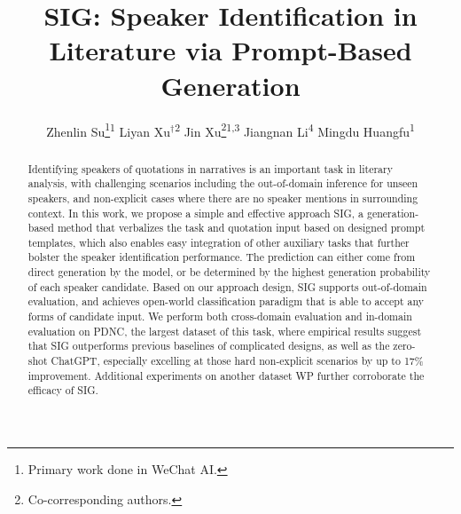 \documentclass[letterpaper]{article} %
\title{SIG: Speaker Identification in Literature via Prompt-Based Generation}
\author {
    Zhenlin Su\thanks{Primary work done in WeChat AI.}\textsuperscript{\rm 1}\;
    Liyan Xu$^\dagger$\textsuperscript{\rm 2}\;
    Jin Xu\thanks{Co-corresponding authors.}\textsuperscript{\rm 1,3}\;
    Jiangnan Li\textsuperscript{\rm 4}\;
    Mingdu Huangfu\textsuperscript{\rm 1}
}
\begin{document}
\maketitle

\begin{abstract}

Identifying speakers of quotations in narratives is an important task in literary analysis, with challenging scenarios including the out-of-domain inference for unseen speakers, and non-explicit cases where there are no speaker mentions in surrounding context. 
In this work, we propose a simple and effective approach SIG, a generation-based method that verbalizes the task and quotation input based on designed prompt templates, which also enables easy integration of other auxiliary tasks that further bolster the speaker identification performance. The prediction can either come from direct generation by the model, or be determined by the highest generation probability of each speaker candidate. Based on our approach design, SIG supports out-of-domain evaluation, and achieves open-world classification paradigm that is able to accept any forms of candidate input. We perform both cross-domain evaluation and in-domain evaluation on PDNC, the largest dataset of this task, where empirical results suggest that SIG outperforms previous baselines of complicated designs, as well as the zero-shot ChatGPT, especially excelling at those hard non-explicit scenarios by up to 17\% improvement. Additional experiments on another dataset WP further corroborate the efficacy of SIG.



\end{abstract}
\end{document}
